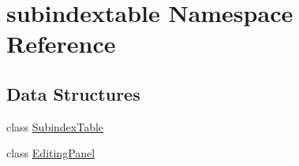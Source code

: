 \hypertarget{namespacesubindextable}{
\section{subindextable Namespace Reference}
\label{namespacesubindextable}
}


\subsection*{Data Structures}
\begin{CompactItemize}
\item 
class \hyperlink{classsubindextable_1_1SubindexTable}{Subindex\-Table}
\item 
class \hyperlink{classsubindextable_1_1EditingPanel}{Editing\-Panel}
\end{CompactItemize}

